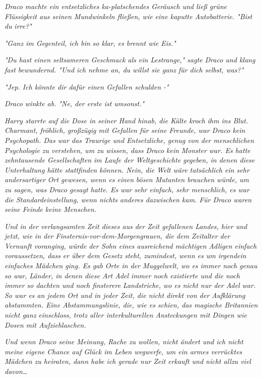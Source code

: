 {\emph{Draco machte ein entsetzliches ka-platschendes Geräusch und ließ grüne Flüssigkeit aus seinen Mundwinkeln fließen, wie eine kaputte Autobatterie. "Bist du} \emph{\emph{irre?}"}

\emph{"Ganz im Gegenteil, ich bin so klar, es brennt wie Eis."}

\emph{"Du hast einen seltsameren Geschmack als ein Lestrange," sagte Draco und klang fast bewundernd. "Und ich nehme an, du willst sie ganz für dich selbst, was?"}

\emph{"Jep. Ich könnte dir dafür einen Gefallen schulden -"}

\emph{Draco winkte ab. "Ne, der erste ist umsonst."}

\emph{Harry starrte auf die Dose in seiner Hand hinab, die Kälte kroch ihm ins Blut. Charmant, fröhlich, großzügig mit Gefallen für seine Freunde, war Draco kein Psychopath. Das war das Traurige und Entsetzliche, genug von der menschlichen Psychologie zu verstehen, um zu wissen, dass Draco} \emph{\emph{kein}} \emph{Monster war. Es hatte zehntausende Gesellschaften im Laufe der Weltgeschichte gegeben, in denen diese Unterhaltung hätte stattfinden können. Nein, die Welt wäre tatsächlich ein sehr andersartiger Ort gewesen, wenn es einen} \emph{\emph{bösen Mutanten}} \emph{brauchen würde, um zu sagen, was Draco gesagt hatte. Es war sehr einfach, sehr menschlich, es war die Standardeinstellung, wenn nichts anderes dazwischen kam. Für Draco waren seine Feinde keine Menschen.}

\emph{Und in der verlangsamten Zeit dieses aus der Zeit gefallenen Landes, hier und jetzt, wie in der Finsternis-vor-dem-Morgengrauen, die dem Zeitalter der Vernunft voranging, würde der Sohn eines ausreichend mächtigen Adligen einfach voraussetzen, dass er über dem Gesetz steht, zumindest, wenn es um irgendein einfaches Mädchen ging. Es gab Orte in der Muggelwelt, wo es immer noch genau so war, Länder, in denen diese Art Adel immer noch existierte und die noch immer so dachten und noch finsterere Landstriche, wo es nicht nur der Adel war. So war es an jedem Ort und in jeder Zeit, die nicht direkt von der Aufklärung abstammten. Eine Abstammungslinie, die, wie es schien, das magische Britannien nicht ganz einschloss, trotz aller interkulturellen Ansteckungen mit Dingen wie Dosen mit Aufziehlaschen.}

\emph{\emph{Und wenn Draco seine Meinung, Rache zu wollen, nicht ändert und ich nicht meine eigene Chance auf Glück im Leben wegwerfe, um ein armes verrücktes Mädchen zu heiraten, dann habe ich gerade nur Zeit erkauft und nicht allzu viel davon…}}

}
